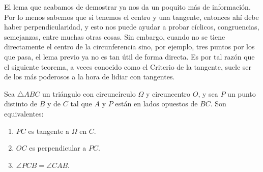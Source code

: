 \documentclass{article}
\begin{document}
El lema que acabamos de demostrar ya nos da un poquito más de información. Por
lo menos sabemos que si tenemos el centro y una tangente, entonces ahí debe
haber perpendicularidad, y esto nos puede ayudar a probar cíclicos, congruencias,
semejanzas, entre muchas otras cosas. Sin embargo, cuando no se tiene
directamente el centro de la circunferencia sino, por ejemplo, tres puntos
por los que pasa, el lema previo ya no es tan útil de forma directa. Es por 
tal razón que el siguiente teorema, a veces conocido como el Criterio 
de la tangente, suele ser de los más poderosos a la hora de lidiar con tangentes.

\newpage

\begin{teorema}
    Sea $\triangle ABC$ un triángulo con circuncírculo $\Omega$ y 
    circuncentro $O$, y sea $P$ un punto distinto de $B$ y de $C$ tal que
    $A$ y $P$ están en lados opuestos de $BC$. Son equivalentes:\\

    \begin{enumerate}
        \item $PC$ es tangente a $\Omega$ en $C$.
        \item  $OC$ es perpendicular a $PC$.
        \item $\angle PCB = \angle CAB$.
    \end{enumerate}
\end{teorema}
\end{document}
